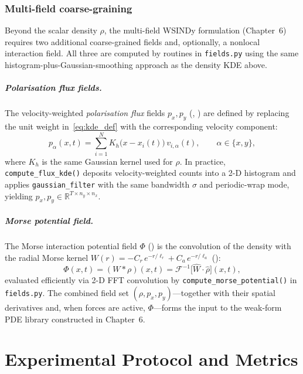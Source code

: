\documentclass{report}
\theoremstyle{plain}
\theoremstyle{remark}
\numberwithin{equation}{section}              %
\begin{document}
\subsection{Multi-field coarse-graining}
\label{sec:multifield_cg}

Beyond the scalar density $\rho$, the multi-field WSINDy formulation (Chapter~6) requires
two additional coarse-grained fields and, optionally, a nonlocal interaction field.
All three are computed by routines in \texttt{fields.py} using the same
histogram-plus-Gaussian-smoothing approach as the density KDE above.

\paragraph{Polarisation flux fields.}
The velocity-weighted \emph{polarisation flux} fields $p_x,p_y$ (, )
are defined by replacing the unit weight in~\eqref{eq:kde_def} with the
corresponding velocity component:
\begin{equation}
p_\alpha(x,t)
=
\sum_{i=1}^N K_h\!\bigl(x-x_i(t)\bigr)\,v_{i,\alpha}(t),
\qquad \alpha\in\{x,y\},
\label{eq:flux_kde}
\end{equation}
where $K_h$ is the same Gaussian kernel used for $\rho$.
In practice, \texttt{compute\_flux\_kde()} deposits velocity-weighted counts
into a 2-D histogram and applies \texttt{gaussian\_filter} with the same
bandwidth $\sigma$ and periodic-wrap mode, yielding
$p_x,p_y\in\mathbb{R}^{T\times n_y\times n_x}$.

\paragraph{Morse potential field.}
The Morse interaction potential field $\Phi$ () is the convolution
of the density with the radial Morse kernel
$W(r) = -C_r\,e^{-r/\ell_r} + C_a\,e^{-r/\ell_a}$ ():
\begin{equation}
\Phi(x,t)
=
(W * \rho)(x,t)
=
\mathcal{F}^{-1}\!\bigl[\hat W \cdot \hat\rho\bigr](x,t),
\label{eq:morse_potential_field}
\end{equation}
evaluated efficiently via 2-D FFT convolution by
\texttt{compute\_morse\_potential()} in \texttt{fields.py}.
The combined field set $(\rho, p_x, p_y)$---together with their spatial
derivatives and, when forces are active, $\Phi$---forms the input to the
weak-form PDE library constructed in Chapter~6.
 
%
\chapter{Experimental Protocol and Metrics}
\label{ch:exp_protocol_metrics}
\end{document}
